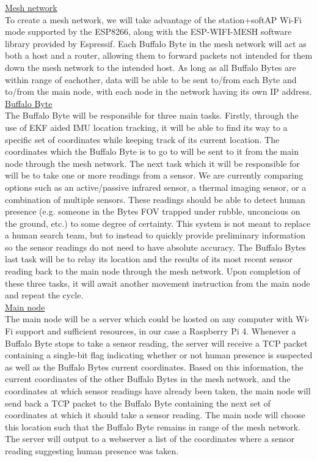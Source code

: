 \documentclass[10pt]{article}
\begin{document}
\underline{Mesh network}\\[0.25\baselineskip]
To create a mesh network, we will take advantage of the station+softAP Wi-Fi mode supported by the ESP8266, along with the ESP-WIFI-MESH software library provided by Espressif. Each Buffalo Byte in the mesh network will act as both a host and a router, allowing them to forward packets not intended for them down the mesh network to the intended host. As long as all Buffalo Bytes are within range of eachother, data will be able to be sent to/from each Byte and to/from the main node, with each node in the network having its own IP address.\\[\baselineskip]
\underline{Buffalo Byte}\\[0.25\baselineskip]
The Buffalo Byte will be responsible for three main tasks. Firstly, through the use of EKF aided IMU location tracking, it will be able to find its way to a specific set of coordinates while keeping track of its current location. The coordinates which the Buffalo Byte is to go to will be sent to it from the main node through the mesh network. The next task which it will be responsible for will be to take one or more readings from a sensor. We are currently comparing options such as an active/passive infrared sensor, a thermal imaging sensor, or a combination of multiple sensors. These readings should be able to detect human presence (e.g. someone in the Bytes FOV trapped under rubble, unconcious on the ground, etc.) to some degree of certainty. This system is not meant to replace a human search team, but to instead to quickly provide preliminary information so the sensor readings do not need to have absolute accuracy. The Buffalo Bytes last task will be to relay its location and the results of its most recent sensor reading back to the main node through the mesh network. Upon completion of these three tasks, it will await another movement instruction from the main node and repeat the cycle.\\[\baselineskip]
\underline{Main node}\\[0.25\baselineskip]
The main node will be a server which could be hosted on any computer with Wi-Fi support and sufficient resources, in our case a Raspberry Pi 4. Whenever a Buffalo Byte stops to take a sensor reading, the server will receive a TCP packet containing a single-bit flag indicating whether or not human presence is suspected as well as the Buffalo Bytes current coordinates. Based on this information, the current coordinates of the other Buffalo Bytes in the mesh network, and the coordinates at which sensor readings have already been taken, the main node will send back a TCP packet to the Buffalo Byte containing the next set of coordinates at which it should take a sensor reading. The main node will choose this location such that the Buffalo Byte remains in range of the mesh network. The server will output to a webserver a list of the coordinates where a sensor reading suggesting human presence was taken.
\end{document}
